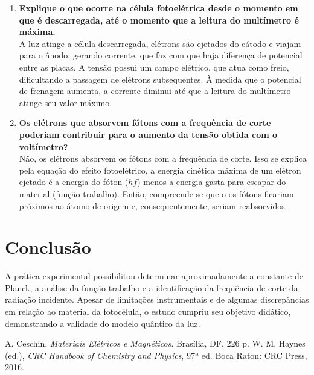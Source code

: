 \documentclass[conference]{IEEEtran}
\begin{document}
\begin{enumerate}
    \item \textbf{Explique o que ocorre na célula fotoelétrica desde o momento em que é descarregada, até o momento que a leitura do multímetro é máxima.} \\

    A luz atinge a célula descarregada, elétrons são ejetados do cátodo e viajam para o ânodo, gerando corrente, que faz com que haja diferença de potencial entre as placas. A tensão possui um campo elétrico, que atua como freio, dificultando a passagem de elétrons subsequentes. À medida que o potencial de frenagem aumenta, a corrente diminui até que a leitura do multímetro atinge seu valor máximo. \\

    \item \textbf{Os elétrons que absorvem fótons com a frequência de corte poderiam contribuir para o aumento da tensão obtida com o voltímetro?} \\

    Não, os elétrons absorvem os fótons com a frequência de corte. Isso se explica pela equação do efeito fotoelétrico, a energia cinética máxima de um elétron ejetado é a energia do fóton ($hf$) menos a energia gasta para escapar do material (função trabalho). Então, compreende-se que o os fótons ficariam próximos ao átomo de origem e, consequentemente, seriam reabsorvidos. \\
    
\end{enumerate}


\section{Conclusão}
A prática experimental possibilitou determinar aproximadamente
a constante de Planck, a análise da função trabalho e a identificação da frequência de corte da radiação incidente. Apesar de limitações instrumentais e de algumas discrepâncias em relação ao material da fotocélula, o estudo cumpriu seu objetivo didático, demonstrando a validade do modelo quântico da luz.

\begin{thebibliography}{99}
     A. Ceschin, \textit{Materiais Elétricos e Magnéticos}. Brasília, DF, 226 p.
     W. M. Haynes (ed.), \textit{CRC Handbook of Chemistry and Physics}, 97ª ed. Boca Raton: CRC Press, 2016.
\end{thebibliography}
\end{document}
